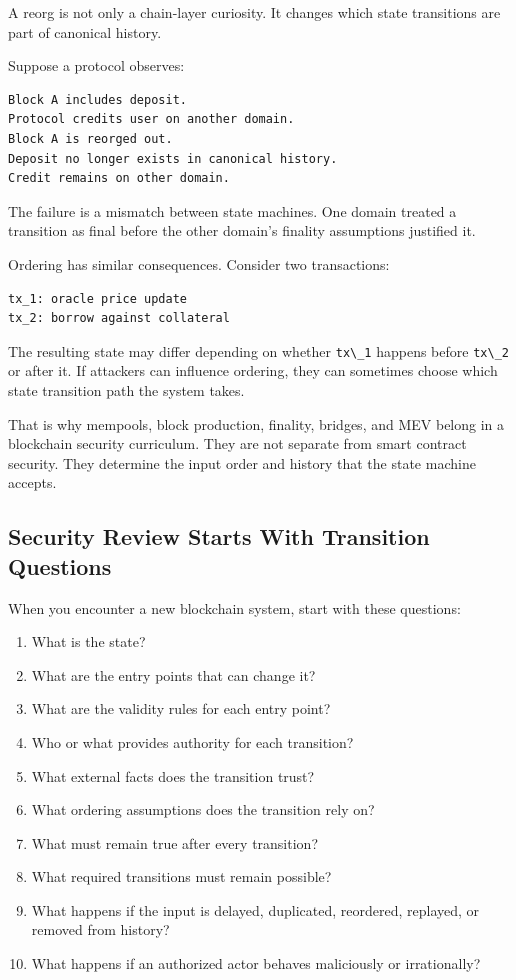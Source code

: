 A reorg is not only a chain-layer curiosity. It changes which state
transitions are part of canonical history.

Suppose a protocol observes:

\begin{lstlisting}
Block A includes deposit.
Protocol credits user on another domain.
Block A is reorged out.
Deposit no longer exists in canonical history.
Credit remains on other domain.
\end{lstlisting}

The failure is a mismatch between state machines. One domain treated a
transition as final before the other domain's finality assumptions
justified it.

Ordering has similar consequences. Consider two transactions:

\begin{lstlisting}
tx_1: oracle price update
tx_2: borrow against collateral
\end{lstlisting}

The resulting state may differ depending on whether
\passthrough{\lstinline!tx\_1!} happens before
\passthrough{\lstinline!tx\_2!} or after it. If attackers can influence
ordering, they can sometimes choose which state transition path the
system takes.

That is why mempools, block production, finality, bridges, and MEV
belong in a blockchain security curriculum. They are not separate from
smart contract security. They determine the input order and history that
the state machine accepts.

\subsection{Security Review Starts With Transition Questions}

When you encounter a new blockchain system, start with these questions:

\begin{enumerate}
\def\labelenumi{\arabic{enumi}.}
\tightlist
\item
  What is the state?
\item
  What are the entry points that can change it?
\item
  What are the validity rules for each entry point?
\item
  Who or what provides authority for each transition?
\item
  What external facts does the transition trust?
\item
  What ordering assumptions does the transition rely on?
\item
  What must remain true after every transition?
\item
  What required transitions must remain possible?
\item
  What happens if the input is delayed, duplicated, reordered, replayed,
  or removed from history?
\item
  What happens if an authorized actor behaves maliciously or
  irrationally?
\end{enumerate}

